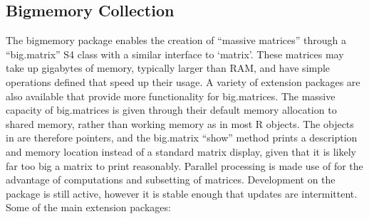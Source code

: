 \hypertarget{sec:bigmemory-collection}{%
    \subsection{Bigmemory Collection}\label{sec:bigmemory-collection}}

The bigmemory package enables the creation of ``massive matrices''
through a ``big.matrix'' S4 class with a similar interface to
`matrix'\cite{kane13:bigmemory}. These matrices may take up gigabytes of
memory, typically larger than RAM, and have simple operations defined
that speed up their usage. A variety of extension packages are also
available that provide more functionality for big.matrices. The massive
capacity of big.matrices is given through their default memory
allocation to shared memory, rather than working memory as in most R
objects. The objects in \R are therefore pointers, and the big.matrix
``show'' method prints a description and memory location instead of a
standard matrix display, given that it is likely far too big a matrix to
print reasonably. Parallel processing is made use of for the advantage
of computations and subsetting of matrices. Development on the package
is still active, however it is stable enough that updates are
intermittent. Some of the main extension packages:

